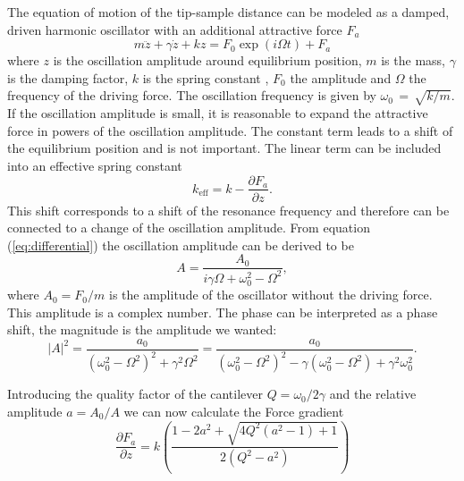 \documentclass[a4paper]{scrartcl}
\numberwithin{equation}{section}
\numberwithin{figure}{section}
\numberwithin{table}{section}
\newcommand{\Formel}[1]{(\ref{#1})}
\begin{document}
The equation of motion of the tip-sample distance can be modeled as a damped, driven harmonic oscillator with an additional attractive force $F_a$
\begin{equation}
m\ddot{z}+\gamma \dot{z}+kz=F_{0} \exp( {i \Omega t})+F_{a} \label{eq:differential}
\end{equation}
where $z$ is the oscillation amplitude around equilibrium position, $m$ is the mass, $\gamma$ is the damping factor, $k$ is the spring constant , $F_0$  the amplitude and $\Omega$ the frequency of the driving force. The oscillation frequency is given by $\omega_0\,=\,\sqrt{k/m}$. If the oscillation amplitude is small, it is reasonable to expand the attractive force in powers of the oscillation amplitude. The constant term leads to a shift of the equilibrium position and is not important. The linear term can be included into an effective spring constant
\begin{equation}
k_\text{eff}=k-\frac{\partial F_{a}}{\partial z} \label{eq:change}.
\end{equation}
This shift corresponds to a shift of the resonance frequency and therefore can be connected to a change of the oscillation amplitude. From equation \Formel{eq:differential} the oscillation amplitude can be derived to be
\begin{equation}
A=\frac{A_{0}}{i\gamma\Omega+\omega_{0}^{2}-\Omega^{2}},
\end{equation}
where $A_0=F_0/m$ is the amplitude of the oscillator without the driving force. This amplitude is a complex number. The phase can be interpreted as a phase shift, the magnitude is the amplitude we wanted:
\begin{equation}
|A|^{2}=\frac{a_{0}}{(\omega_{0}^{2}-\Omega^{2})^{2}+\gamma^{2}\Omega^{2}}=\frac{a_{0}}{(\omega_{0}^{2}-\Omega^{2})^{2}-\gamma(\omega_{0}^{2}-\Omega^{2})+\gamma^{2}\omega_{0}^{2}}.
\end{equation}

Introducing the quality factor of the cantilever $Q=\omega_0/2\gamma$ and the relative amplitude $a=A_0/A$ we can now calculate the Force gradient
\begin{equation}
\frac{\partial F_{a}}{\partial z}=k\left(\frac{1-2a^{2}+\sqrt{4Q^{2}\left(a^{2}-1\right)+1}}{2\left(Q^{2}-a^{2}\right)}\right)
\end{equation}







\clearpage
 

\end{document}
